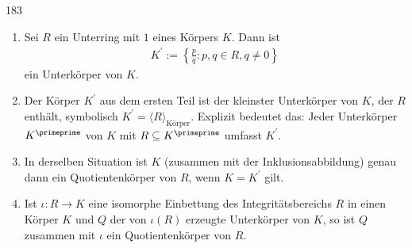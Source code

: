 \begin{algebraUE}{183}
\begin{enumerate}
  \item Sei $R$ ein Unterring mit $1$ eines Körpers $K$. Dann ist
  \begin{align*}
    K^{\prime} := \left\{\frac{p}{q}: p,q \in R, q \neq 0 \right\}
  \end{align*}
  ein Unterkörper von $K$.
  \item Der Körper $K^{\prime}$ aus dem ersten Teil ist der kleinster Unterkörper
  von $K$, der $R$ enthält, symbolisch $K^{\prime} = \langle R \rangle_{\text{Körper}}$.
  Explizit bedeutet das: Jeder Unterkörper $K^{\primeprime}$ von $K$ mit $R \subseteq K^{\primeprime}$
  umfasst $K^{\prime}$.
  \item In derselben Situation ist $K$ (zusammen mit der Inklusionsabbildung) genau
  dann ein Quotientenkörper von $R$, wenn $K = K^{\prime}$ gilt.
  \item Ist $\iota: R \rightarrow K$ eine isomorphe Einbettung des Integritätsbereichs $R$
  in einen Körper $K$ und $Q$ der von $\iota(R)$ erzeugte Unterkörper von $K$,
  so ist $Q$ zusammen mit $\iota$ ein Quotientenkörper von $R$.
\end{enumerate}
\end{algebraUE}
